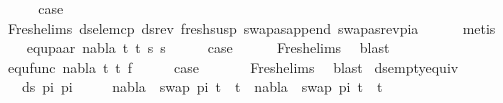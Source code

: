 \begin{isabellebody}
\ \ \isamarkupfalse%
\ \isamarkupfalse%
\ {\isacharquery}{\kern0pt}case\ \isanewline
\ \ \ \ \isamarkupfalse%
\ Fresh{\isacharunderscore}{\kern0pt}elims{\isacharparenleft}{\kern0pt}{}{\isacharparenright}{\kern0pt}\ ds{\isacharunderscore}{\kern0pt}elem{\isacharunderscore}{\kern0pt}cp\ ds{\isacharunderscore}{\kern0pt}rev\ fresh{\isacharunderscore}{\kern0pt}susp\ swapas{\isacharunderscore}{\kern0pt}append\ swapas{\isacharunderscore}{\kern0pt}rev{\isacharunderscore}{\kern0pt}pi{\isacharunderscore}{\kern0pt}a\isanewline
\ \ \ \ \isamarkupfalse%
\ metis\isanewline
{}\isamarkupfalse%
\isanewline
\ \ \isamarkupfalse%
\ {\isacharparenleft}{\kern0pt}equ{\isacharunderscore}{\kern0pt}paar\ nabla\ t{}\ t{}\ s{}\ s{}{\isacharparenright}{\kern0pt}\isanewline
\ \ \isamarkupfalse%
\ \isamarkupfalse%
\ {\isacharquery}{\kern0pt}case\isanewline
\ \ \ \ \isamarkupfalse%
\ Fresh{\isacharunderscore}{\kern0pt}elims{\isacharparenleft}{\kern0pt}{}{\isacharparenright}{\kern0pt}\ \isamarkupfalse%
\ blast\isanewline
{}\isamarkupfalse%
\isanewline
\ \ \isamarkupfalse%
\ {\isacharparenleft}{\kern0pt}equ{\isacharunderscore}{\kern0pt}func\ nabla\ t{}\ t{}\ f{\isacharparenright}{\kern0pt}\isanewline
\ \ \isamarkupfalse%
\ \isamarkupfalse%
\ {\isacharquery}{\kern0pt}case\ \isanewline
\ \ \ \ \isamarkupfalse%
\ Fresh{\isacharunderscore}{\kern0pt}elims{\isacharparenleft}{\kern0pt}{}{\isacharparenright}{\kern0pt}\ \isamarkupfalse%
\ blast\isanewline
{}\isamarkupfalse%
%
\endisatagproof
{\isafoldproof}%
%
\isadelimproof
\isanewline
%
\endisadelimproof
\isanewline
\isanewline
\isanewline
\isanewline
{}\isamarkupfalse%
\ ds{\isacharunderscore}{\kern0pt}empty{\isacharunderscore}{\kern0pt}equiv{\isacharunderscore}{\kern0pt}{}{\isacharcolon}{\kern0pt}\isanewline
\ \ \ {\isachardoublequoteopen}ds\ pi{}\ pi{}\ {\isacharequal}{\kern0pt}\ {\isacharbraceleft}{\kern0pt}{\isacharbraceright}{\kern0pt}{\isachardoublequoteclose}\isanewline
\ \ \ {\isachardoublequoteopen}nabla\ {\isasymturnstile}\ swap\ pi{}\ t{}\ {\isasymapprox}\ t{}\ {\isasymLongrightarrow}\ nabla\ {\isasymturnstile}\ swap\ pi{}\ t{}\ {\isasymapprox}\ t{}{\isachardoublequoteclose}\isanewline

\end{isabellebody}
